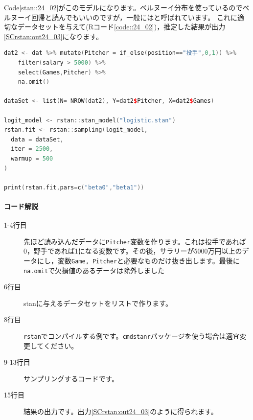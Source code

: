 \documentclass{ltjsbook}
\begin{document}
Code\ref{stan::24_02}がこのモデルになります。ベルヌーイ分布を使っているのでベルヌーイ回帰と読んでもいいのですが，一般にはと呼ばれています。
これに適切なデータセットを与えて(Rコード\ref{code::24_02})，推定した結果が出力\ref{SCrstan:out24_03}になります。

\begin{lstlisting}[language=c++,label={code::24_02},caption={ロジスティック回帰分析を実行するRコード}]
dat2 <- dat %>% mutate(Pitcher = if_else(position=="投手",0,1)) %>% 
    filter(salary > 5000) %>% 
    select(Games,Pitcher) %>% 
    na.omit()

dataSet <- list(N= NROW(dat2), Y=dat2$Pitcher, X=dat2$Games)

logit_model <- rstan::stan_model("logistic.stan")
rstan.fit <- rstan::sampling(logit_model,
  data = dataSet,
  iter = 2500,
  warmup = 500
)

print(rstan.fit,pars=c("beta0","beta1"))
\end{lstlisting}
\paragraph{コード解説}
\begin{description}
  \item[1-4行目] 先ほど読み込んだデータに\verb|Pitcher|変数を作ります。これは投手であれば0，野手であれば1になる変数です。その後，サラリーが5000万円以上のデータにし，変数\verb|Game, Pitcher|と必要なものだけ抜き出します。最後に\verb|na.omit|で欠損値のあるデータは除外しました
  \item[6行目] stanに与えるデータセットをリストで作ります。
  \item[8行目] \texttt{rstan}でコンパイルする例です。\texttt{cmdstanr}パッケージを使う場合は適宜変更してください。
  \item[9-13行目] サンプリングするコードです。
  \item[15行目] 結果の出力です。出力\ref{SCrstan:out24_03}のように得られます。
\end{description} 
\end{document}
